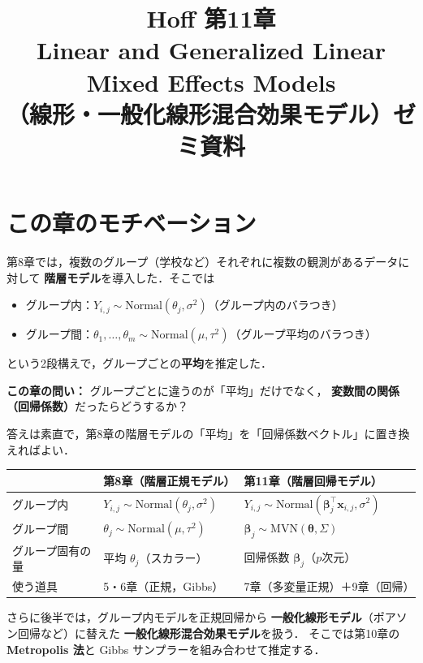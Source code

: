\documentclass[lualatex,ja=standard,a4paper,12pt]{bxjsarticle}
\title{{\large Hoff 第11章} \\[6pt]
       \textbf{Linear and Generalized Linear Mixed Effects Models} \\[4pt]
       {\normalsize （線形・一般化線形混合効果モデル）ゼミ資料}}
\author{}
\date{}
\newcommand{\mvn}{\mathrm{MVN}}
\begin{document}
\maketitle
\thispagestyle{empty}

\section{この章のモチベーション}

第8章では，複数のグループ（学校など）それぞれに複数の観測があるデータに対して
\textbf{階層モデル}を導入した．そこでは
\begin{itemize}
  \item グループ内：$Y_{i,j} \sim \mathrm{Normal}(\theta_j, \sigma^2)$（グループ内のバラつき）
  \item グループ間：$\theta_1, \ldots, \theta_m \sim \mathrm{Normal}(\mu, \tau^2)$（グループ平均のバラつき）
\end{itemize}
という2段構えで，グループごとの\textbf{平均}を推定した．

\medskip
\noindent\textbf{この章の問い：}
グループごとに違うのが「平均」だけでなく，
\textbf{変数間の関係（回帰係数）}だったらどうするか？

\medskip
\noindent 答えは素直で，第8章の階層モデルの「平均」を「回帰係数ベクトル」に置き換えればよい．

\begin{center}
\small
\renewcommand{\arraystretch}{1.5}
\setlength{\tabcolsep}{4pt}
\begin{tabular}{lll}
\toprule
 & 第8章（階層正規モデル） & 第11章（階層回帰モデル） \\
\midrule
グループ内 & $Y_{i,j} \sim \mathrm{Normal}(\theta_j, \sigma^2)$ & $Y_{i,j} \sim \mathrm{Normal}(\bm{\beta}_j^\top \bm{x}_{i,j}, \sigma^2)$ \\
グループ間 & $\theta_j \sim \mathrm{Normal}(\mu, \tau^2)$ & $\bm{\beta}_j \sim \mvn(\bm{\theta}, \Sigma)$ \\
グループ固有の量 & 平均 $\theta_j$（スカラー） & 回帰係数 $\bm{\beta}_j$（$p$次元） \\
使う道具 & 5・6章（正規，Gibbs） & 7章（多変量正規）＋9章（回帰） \\
\bottomrule
\end{tabular}
\end{center}

さらに後半では，グループ内モデルを正規回帰から
\textbf{一般化線形モデル}（ポアソン回帰など）に替えた
\textbf{一般化線形混合効果モデル}を扱う．
そこでは第10章の \textbf{Metropolis 法}と Gibbs サンプラーを組み合わせて推定する．
\end{document}
